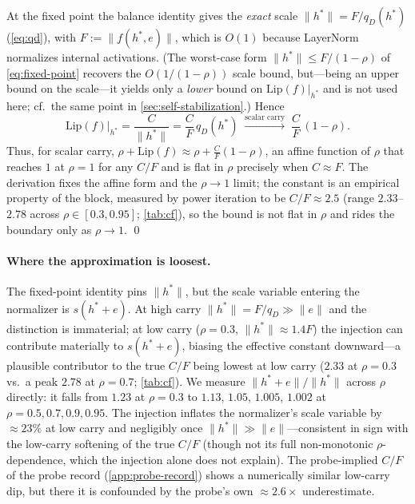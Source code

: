 \documentclass[11pt]{article}
\begin{document}
At the fixed point the balance identity gives the \emph{exact} scale $\|h^*\| = F/q_D(h^*)$ (\cref{eq:qd}), with $F := \|f(h^*, e)\|$, which is $O(1)$ because LayerNorm normalizes internal activations. (The worst-case form $\|h^*\| \le F/(1-\rho)$ of \cref{eq:fixed-point} recovers the $O(1/(1-\rho))$ scale bound, but---being an upper bound on the scale---it yields only a \emph{lower} bound on $\text{Lip}(f)|_{h^*}$ and is not used here; cf.\ the same point in \cref{sec:self-stabilization}.) Hence
\begin{equation}
\text{Lip}(f)\big|_{h^*} = \frac{C}{\|h^*\|} = \frac{C}{F}\,q_D(h^*)
\;\xrightarrow{\text{scalar carry}}\;
\frac{C}{F}\,(1-\rho).
\end{equation}
Thus, for scalar carry, $\rho + \text{Lip}(f) \approx \rho + \tfrac{C}{F}(1-\rho)$, an affine function of $\rho$ that reaches $1$ at $\rho = 1$ for any $C/F$ and is flat in $\rho$ precisely when $C \approx F$. The derivation fixes the affine form and the $\rho \to 1$ limit; the constant is an empirical property of the block, measured by power iteration to be $C/F \approx 2.5$ (range $2.33$--$2.78$ across $\rho \in [0.3, 0.95]$; \cref{tab:cf}), so the bound is not flat in $\rho$ and rides the boundary only as $\rho \to 1$. \qed

\paragraph{Where the approximation is loosest.} The fixed-point identity pins $\|h^*\|$, but the scale variable entering the normalizer is $s(h^* + e)$. At high carry $\|h^*\| = F/q_D \gg \|e\|$ and the distinction is immaterial; at low carry ($\rho = 0.3$, $\|h^*\| \approx 1.4F$) the injection can contribute materially to $s(h^* + e)$, biasing the effective constant downward---a plausible contributor to the true $C/F$ being lowest at low carry ($2.33$ at $\rho = 0.3$ vs.\ a peak $2.78$ at $\rho = 0.7$; \cref{tab:cf}). We measure $\|h^* + e\|/\|h^*\|$ across $\rho$ directly: it falls from $1.23$ at $\rho = 0.3$ to $1.13$, $1.05$, $1.005$, $1.002$ at $\rho = 0.5, 0.7, 0.9, 0.95$. The injection inflates the normalizer's scale variable by $\approx 23\%$ at low carry and negligibly once $\|h^*\| \gg \|e\|$---consistent in sign with the low-carry softening of the true $C/F$ (though not its full non-monotonic $\rho$-dependence, which the injection alone does not explain). The probe-implied $C/F$ of the probe record (\cref{app:probe-record}) shows a numerically similar low-carry dip, but there it is confounded by the probe's own $\approx 2.6\times$ underestimate.
\end{document}

